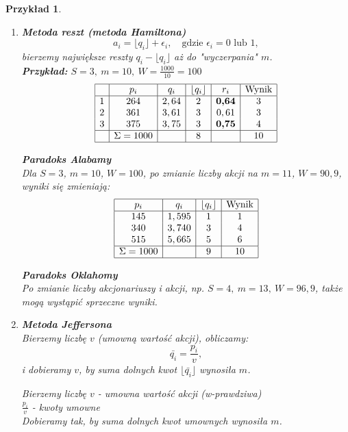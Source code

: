 \documentclass[12pt,a4paper]{article}
\theoremstyle{break}
\newtheorem{example}{Przykład}[section]
\begin{document}
	\begin{example}
		\begin{enumerate}[1)]
			\item \textbf{Metoda reszt (metoda Hamiltona)}\\
			\[
			a_i=\lfloor q_i \rfloor + \epsilon_i, \quad \text{gdzie } \epsilon_i = 0 \text{ lub } 1,
			\]
			bierzemy największe reszty $q_i - \lfloor q_i \rfloor$ aż do "wyczerpania" $m$.\\
			
			\textbf{Przykład:} $S=3,\: m=10,\: W=\frac{1000}{10}=100$\\
			\[
			\begin{array}{|c|c|c|c|c|c|}
				\hline
				& p_i & q_i & \lfloor q_i \rfloor & r_i & \text{Wynik} \\\hline
				1 & 264 & 2,64 & 2 & \textbf{0,64} & 3 \\
				2 & 361 & 3,61 & 3 & 0,61 & 3 \\
				3 & 375 & 3,75 & 3 & \textbf{0,75} & 4 \\\hline
				& \Sigma=1000 & & 8 & & 10 \\\hline
			\end{array}
			\]
			
			\textbf{Paradoks Alabamy}\\
			Dla $S=3$, $m=10$, $W=100$, po zmianie liczby akcji na $m=11$, $W=90,9$, wyniki się zmieniają:
			\[
			\begin{array}{|c|c|c|c|}
				\hline
				p_i & q_i & \lfloor q_i \rfloor & \text{Wynik} \\\hline
				145 & 1,595 & 1 & 1 \\
				340 & 3,740 & 3 & 4 \\
				515 & 5,665 & 5 & 6 \\\hline
				\Sigma=1000 & & 9 & 10 \\\hline
			\end{array}
			\]
			
			\textbf{Paradoks Oklahomy}\\
			Po zmianie liczby akcjonariuszy i akcji, np. $S=4,\: m=13, \: W=96,9$, także mogą wystąpić sprzeczne wyniki.
			
			\item \textbf{Metoda Jeffersona}\\
			Bierzemy liczbę $v$ (umowną wartość akcji), obliczamy:
			\[
			\bar{q_i} = \frac{p_i}{v},
			\]
			i dobieramy $v$, by suma dolnych kwot $\lfloor \bar{q_i} \rfloor$ wynosiła $m$.

			Bierzemy liczbę $v$ - umowna wartość akcji (w-prawdziwa)\\
			$\frac{p_i}{v}$ - kwoty umowne\\
			Dobieramy tak, by suma dolnych kwot umownych wynosiła $m$.\\\\
			

\end{enumerate}
\end{example}
\end{document}
